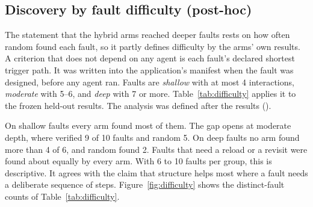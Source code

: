 \subsection{Discovery by fault difficulty (post-hoc)}
\label{sec:difficulty}

The statement that the hybrid arms reached deeper faults rests on how often random found
each fault, so it partly defines difficulty by the arms' own results. A criterion that does
not depend on any agent is each fault's declared shortest trigger path. It was written into
the application's manifest when the fault was designed, before any agent ran. Faults are
\emph{shallow} with at most 4 interactions, \emph{moderate} with 5--6, and \emph{deep} with
7 or more. Table~\ref{tab:difficulty} applies it to the frozen held-out results. The
analysis was defined after the results ().

\begin{table}[H]
\centering
\small
\caption{Held-out evaluation by declared fault difficulty (post-hoc): distinct faults
verified, and in brackets runs that verified them out of all (fault, seed) pairs.}
\label{tab:difficulty}
\end{table}

On shallow faults every arm found most of them. The gap opens at moderate depth, where
 verified 9 of 10 faults and random 5. On deep faults no arm found
more than 4 of 6, and random found 2. Faults that need a reload or a revisit were found
about equally by every arm. With 6 to 10 faults per group, this is descriptive. It agrees
with the claim that structure helps most where a fault needs a deliberate sequence of steps.
Figure~\ref{fig:difficulty} shows the distinct-fault counts of Table~\ref{tab:difficulty}.

